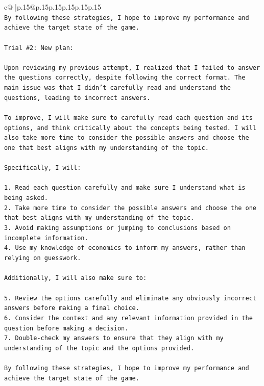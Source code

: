 \documentclass{article}
\begin{document}
{\begin{supertabular}{c@{$\;$}|p{.15\linewidth}@{}p{.15\linewidth}p{.15\linewidth}p{.15\linewidth}p{.15\linewidth}p{.15\linewidth}}
{{{\\ 
\texttt{By following these strategies, I hope to improve my performance and achieve the target state of the game.} \\
\\ 
\texttt{Trial \#2: New plan: } \\
\\ 
\texttt{Upon reviewing my previous attempt, I realized that I failed to answer the questions correctly, despite following the correct format. The main issue was that I didn't carefully read and understand the questions, leading to incorrect answers. } \\
\\ 
\texttt{To improve, I will make sure to carefully read each question and its options, and think critically about the concepts being tested. I will also take more time to consider the possible answers and choose the one that best aligns with my understanding of the topic. } \\
\\ 
\texttt{Specifically, I will:} \\
\\ 
\texttt{1. Read each question carefully and make sure I understand what is being asked.} \\
\texttt{2. Take more time to consider the possible answers and choose the one that best aligns with my understanding of the topic.} \\
\texttt{3. Avoid making assumptions or jumping to conclusions based on incomplete information.} \\
\texttt{4. Use my knowledge of economics to inform my answers, rather than relying on guesswork.} \\
\\ 
\texttt{Additionally, I will also make sure to:} \\
\\ 
\texttt{5. Review the options carefully and eliminate any obviously incorrect answers before making a final choice.} \\
\texttt{6. Consider the context and any relevant information provided in the question before making a decision.} \\
\texttt{7. Double{-}check my answers to ensure that they align with my understanding of the topic and the options provided.} \\
\\ 
\texttt{By following these strategies, I hope to improve my performance and achieve the target state of the game.} \\
}}}
\end{supertabular}}
\end{document}
